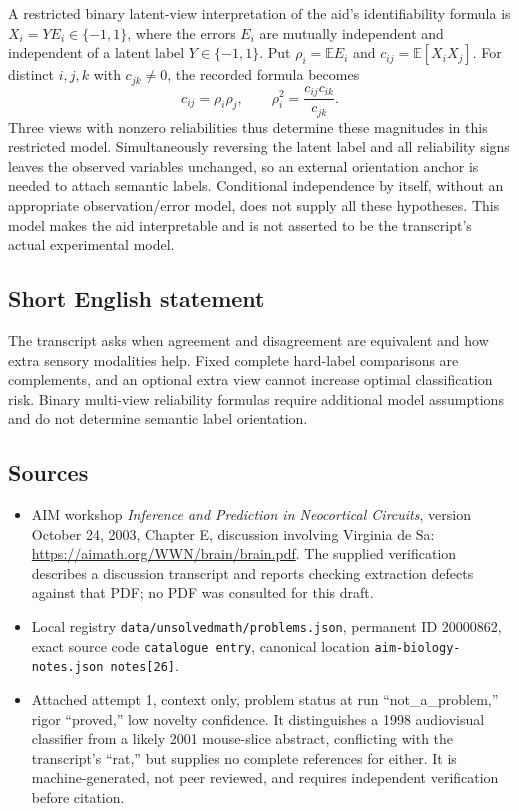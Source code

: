 \documentclass[11pt]{article}
\newcommand{\E}{\mathbb{E}}
\begin{document}
A restricted binary latent-view interpretation of the aid's identifiability formula is $X_i=YE_i\in\{-1,1\}$, where the errors $E_i$ are mutually independent and independent of a latent label $Y\in\{-1,1\}$. Put $\rho_i=\E E_i$ and $c_{ij}=\E[X_iX_j]$. For distinct $i,j,k$ with $c_{jk}\ne0$, the recorded formula becomes
\[
 c_{ij}=\rho_i\rho_j,\qquad
 \rho_i^2=\frac{c_{ij}c_{ik}}{c_{jk}}.
\]
Three views with nonzero reliabilities thus determine these magnitudes in this restricted model. Simultaneously reversing the latent label and all reliability signs leaves the observed variables unchanged, so an external orientation anchor is needed to attach semantic labels. Conditional independence by itself, without an appropriate observation/error model, does not supply all these hypotheses. This model makes the aid interpretable and is not asserted to be the transcript's actual experimental model.
\subsection{Short English statement}
The transcript asks when agreement and disagreement are equivalent and how extra sensory modalities help. Fixed complete hard-label comparisons are complements, and an optional extra view cannot increase optimal classification risk. Binary multi-view reliability formulas require additional model assumptions and do not determine semantic label orientation.
\subsection{Sources}
\begin{itemize}
\item AIM workshop \emph{Inference and Prediction in Neocortical Circuits}, version October 24, 2003, Chapter E, discussion involving Virginia de Sa: \url{https://aimath.org/WWN/brain/brain.pdf}. The supplied verification describes a discussion transcript and reports checking extraction defects against that PDF; no PDF was consulted for this draft.
\item Local registry \texttt{data/unsolvedmath/problems.json}, permanent ID 20000862, exact source code \texttt{catalogue entry}, canonical location \texttt{aim-biology-notes.json notes[26]}.
\item Attached attempt 1, context only, problem status at run ``not\_a\_problem,'' rigor ``proved,'' low novelty confidence. It distinguishes a 1998 audiovisual classifier from a likely 2001 mouse-slice abstract, conflicting with the transcript's ``rat,'' but supplies no complete references for either. It is machine-generated, not peer reviewed, and requires independent verification before citation.
\end{itemize}
\end{document}
